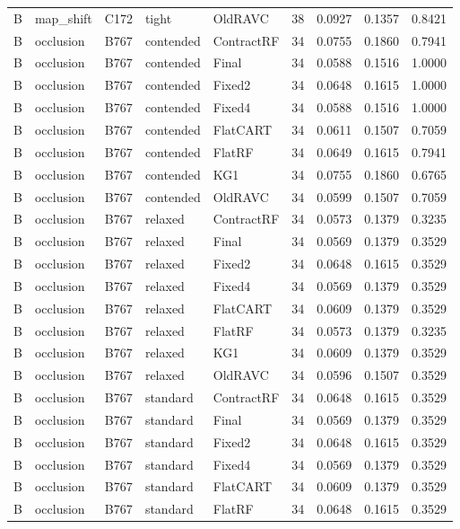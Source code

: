 \begin{longtable}{@{}lllllllll@{}}
B & map\_shift & C172 & tight & OldRAVC & 38 & 0.0927 & 0.1357 & 0.8421\\
B & occlusion & B767 & contended & ContractRF & 34 & 0.0755 & 0.1860 & 0.7941\\
B & occlusion & B767 & contended & Final & 34 & 0.0588 & 0.1516 & 1.0000\\
B & occlusion & B767 & contended & Fixed2 & 34 & 0.0648 & 0.1615 & 1.0000\\
B & occlusion & B767 & contended & Fixed4 & 34 & 0.0588 & 0.1516 & 1.0000\\
B & occlusion & B767 & contended & FlatCART & 34 & 0.0611 & 0.1507 & 0.7059\\
B & occlusion & B767 & contended & FlatRF & 34 & 0.0649 & 0.1615 & 0.7941\\
B & occlusion & B767 & contended & KG1 & 34 & 0.0755 & 0.1860 & 0.6765\\
B & occlusion & B767 & contended & OldRAVC & 34 & 0.0599 & 0.1507 & 0.7059\\
B & occlusion & B767 & relaxed & ContractRF & 34 & 0.0573 & 0.1379 & 0.3235\\
B & occlusion & B767 & relaxed & Final & 34 & 0.0569 & 0.1379 & 0.3529\\
B & occlusion & B767 & relaxed & Fixed2 & 34 & 0.0648 & 0.1615 & 0.3529\\
B & occlusion & B767 & relaxed & Fixed4 & 34 & 0.0569 & 0.1379 & 0.3529\\
B & occlusion & B767 & relaxed & FlatCART & 34 & 0.0609 & 0.1379 & 0.3529\\
B & occlusion & B767 & relaxed & FlatRF & 34 & 0.0573 & 0.1379 & 0.3235\\
B & occlusion & B767 & relaxed & KG1 & 34 & 0.0609 & 0.1379 & 0.3529\\
B & occlusion & B767 & relaxed & OldRAVC & 34 & 0.0596 & 0.1507 & 0.3529\\
B & occlusion & B767 & standard & ContractRF & 34 & 0.0648 & 0.1615 & 0.3529\\
B & occlusion & B767 & standard & Final & 34 & 0.0569 & 0.1379 & 0.3529\\
B & occlusion & B767 & standard & Fixed2 & 34 & 0.0648 & 0.1615 & 0.3529\\
B & occlusion & B767 & standard & Fixed4 & 34 & 0.0569 & 0.1379 & 0.3529\\
B & occlusion & B767 & standard & FlatCART & 34 & 0.0609 & 0.1379 & 0.3529\\
B & occlusion & B767 & standard & FlatRF & 34 & 0.0648 & 0.1615 & 0.3529\\

\end{longtable}
